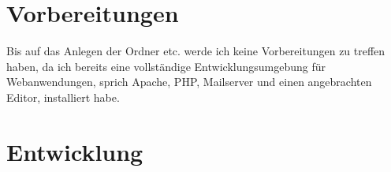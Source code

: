\section{Vorbereitungen}
Bis auf das Anlegen der Ordner etc. werde ich keine Vorbereitungen zu
treffen haben, da ich bereits eine vollständige Entwicklungsumgebung
für Webanwendungen, sprich Apache, PHP, Mailserver und einen
angebrachten Editor, installiert habe.

\section{Entwicklung}

